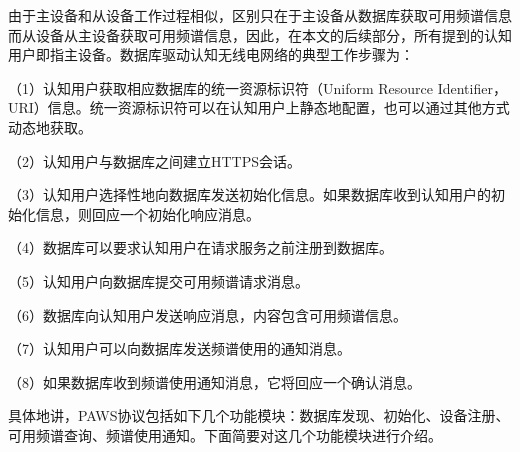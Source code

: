 由于主设备和从设备工作过程相似，区别只在于主设备从数据库获取可用频谱信息而从设备从主设备获取可用频谱信息，因此，在本文的后续部分，所有提到的认知用户即指主设备。数据库驱动认知无线电网络的典型工作步骤为：

（1）认知用户获取相应数据库的统一资源标识符（Uniform Resource Identifier，URI）信息。统一资源标识符可以在认知用户上静态地配置，也可以通过其他方式动态地获取。

（2）认知用户与数据库之间建立HTTPS会话。

（3）认知用户选择性地向数据库发送初始化信息。如果数据库收到认知用户的初始化信息，则回应一个初始化响应消息。

（4）数据库可以要求认知用户在请求服务之前注册到数据库。

（5）认知用户向数据库提交可用频谱请求消息。

（6）数据库向认知用户发送响应消息，内容包含可用频谱信息。

（7）认知用户可以向数据库发送频谱使用的通知消息。

（8）如果数据库收到频谱使用通知消息，它将回应一个确认消息。


具体地讲，PAWS协议包括如下几个功能模块：数据库发现、初始化、设备注册、可用频谱查询、频谱使用通知。下面简要对这几个功能模块进行介绍。

